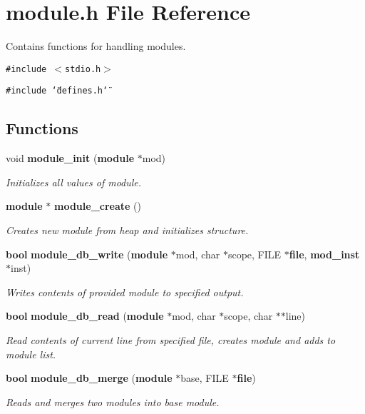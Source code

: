 \section{module.h File Reference}
\label{module_8h}
Contains functions for handling modules. 


{\tt \#include $<$stdio.h$>$}\par
{\tt \#include \char`\"{}defines.h\char`\"{}}\par
\subsection*{Functions}
\begin{CompactItemize}
\item 
void {\bf module\_\-init} ({\bf module} $\ast$mod)
\begin{CompactList}\small\item\em Initializes all values of module.\item\end{CompactList}\item 
{\bf module} $\ast$ {\bf module\_\-create} ()
\begin{CompactList}\small\item\em Creates new module from heap and initializes structure.\item\end{CompactList}\item 
{\bf bool} {\bf module\_\-db\_\-write} ({\bf module} $\ast$mod, char $\ast$scope, FILE $\ast${\bf file}, {\bf mod\_\-inst} $\ast$inst)
\begin{CompactList}\small\item\em Writes contents of provided module to specified output.\item\end{CompactList}\item 
{\bf bool} {\bf module\_\-db\_\-read} ({\bf module} $\ast$mod, char $\ast$scope, char $\ast$$\ast$line)
\begin{CompactList}\small\item\em Read contents of current line from specified file, creates module and adds to module list.\item\end{CompactList}\item 
{\bf bool} {\bf module\_\-db\_\-merge} ({\bf module} $\ast$base, FILE $\ast${\bf file})
\begin{CompactList}\small\item\em Reads and merges two modules into base module.\item\end{CompactList}\item 
$$
\end{CompactItemize}
